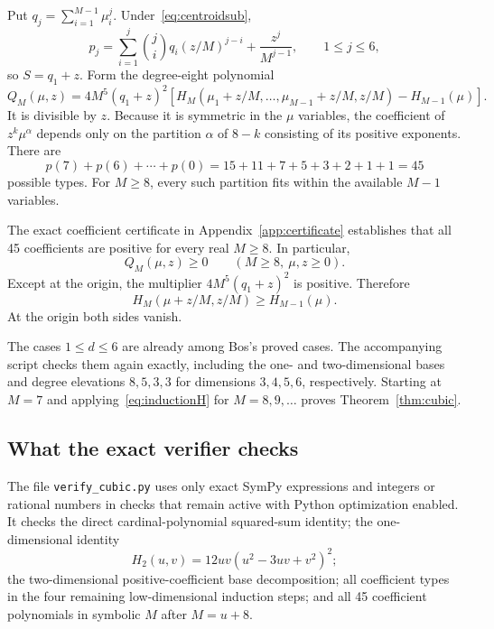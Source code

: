 \documentclass[11pt,a4paper]{article}
\theoremstyle{remark}
\begin{document}
Put $q_j=\sum_{i=1}^{M-1}\mu_i^j$. Under~\eqref{eq:centroidsub},
\begin{equation}\label{eq:pq}
 p_j=\sum_{i=1}^j\binom ji q_i(z/M)^{j-i}+\frac{z^j}{M^{j-1}},
 \qquad 1\le j\le6,
\end{equation}
so $S=q_1+z$. Form the degree-eight polynomial
\begin{equation}\label{eq:Q}
 Q_M(\mu,z)=4M^5(q_1+z)^2
 \left[H_M(\mu_1+z/M,\ldots,\mu_{M-1}+z/M,z/M)
       -H_{M-1}(\mu)\right].
\end{equation}
It is divisible by $z$. Because it is symmetric in the $\mu$ variables, the coefficient of $z^k\mu^\alpha$ depends only on the partition $\alpha$ of $8-k$ consisting of its positive exponents. There are
\[
 p(7)+p(6)+\cdots+p(0)=15+11+7+5+3+2+1+1=45
\]
possible types. For $M\ge8$, every such partition fits within the available $M-1$ variables.

The exact coefficient certificate in Appendix~\ref{app:certificate} establishes that all 45 coefficients are positive for every real $M\ge8$. In particular,
\[
 Q_M(\mu,z)\ge0\qquad(M\ge8,\ \mu,z\ge0).
\]
Except at the origin, the multiplier $4M^5(q_1+z)^2$ is positive. Therefore
\begin{equation}\label{eq:inductionH}
 H_M(\mu+z/M,z/M)\ge H_{M-1}(\mu).
\end{equation}
At the origin both sides vanish.

The cases $1\le d\le6$ are already among Bos's proved cases. The accompanying script checks them again exactly, including the one- and two-dimensional bases and degree elevations $8,5,3,3$ for dimensions $3,4,5,6$, respectively. Starting at $M=7$ and applying~\eqref{eq:inductionH} for $M=8,9,\ldots$ proves Theorem~\ref{thm:cubic}.

\subsection{What the exact verifier checks}

The file \texttt{verify\_cubic.py} uses only exact SymPy expressions and integers or rational numbers in checks that remain active with Python optimization enabled. It checks the direct cardinal-polynomial squared-sum identity; the one-dimensional identity
\[
 H_2(u,v)=12uv(u^2-3uv+v^2)^2;
\]
the two-dimensional positive-coefficient base decomposition; all coefficient types in the four remaining low-dimensional induction steps; and all 45 coefficient polynomials in symbolic $M$ after $M=u+8$.
\end{document}
